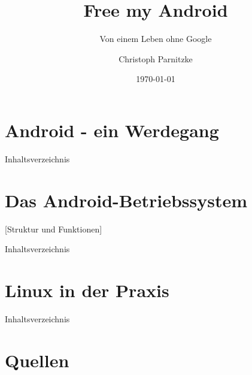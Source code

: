 \documentclass[12pt,utf8]{beamer}
\title{Free my Android}
\subtitle{Von einem Leben ohne Google}
\author[C. Parnitzke]{Christoph Parnitzke}
\institute[FOSS AG]{Free and Open Source Software AG\\ Fakultät für Informatik}
\date{\today}
\begin{document}
\begin{frame}
	\titlepage
\end{frame}

\section{Android - ein Werdegang}

\begin{frame}{Inhaltsverzeichnis}
\end{frame}




\section{Das Android-Betriebssystem}[Struktur und Funktionen]

\begin{frame}{Inhaltsverzeichnis}
\end{frame}




\section{Linux in der Praxis}

\begin{frame}{Inhaltsverzeichnis}
\end{frame}




\section{Quellen}



\end{document}
